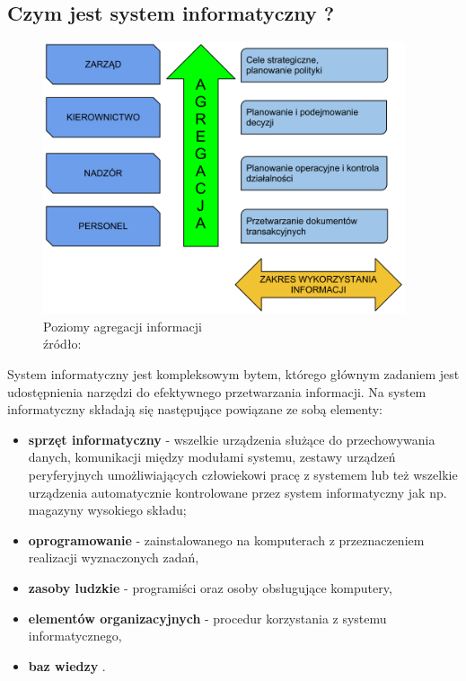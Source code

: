 	\subsection{Czym jest system informatyczny ?}
		\begin{figure}[H]
			\centering
			\includegraphics[width=0.95\textwidth]{images/poziomy_agregacji_informacji}
			\caption[Poziomy agregacji informacji w systemie informatycznym]{
				Poziomy agregacji informacji\\ 
				źródło: \cite{IDL}
			}
			\label{c3:information_level_figure}
		\end{figure}
		System informatyczny jest kompleksowym bytem, którego głównym zadaniem 
		jest udos\-tępnienia narzędzi do efektywnego przetwarzania informacji. 
		Na system informatyczny składają się następujące powiązane ze sobą elementy:
		\begin{itemize}
			\item \textbf{sprzęt informatyczny} - wszelkie urządzenia służące
			do przechowywania danych, komunikacji między modułami systemu, zestawy urządzeń
			peryferyjnych umożliwiających człowiekowi pracę z systemem lub też wszelkie urządzenia
			automatycznie kontrolowane przez system informatyczny jak np. magazyny wysokiego składu;
			\item \textbf{oprogramowanie} - zainstalowanego na komputerach z przeznaczeniem realizacji
			wyznaczonych zadań,
			\item \textbf{zasoby ludzkie} - programiści oraz osoby obsługujące komputery,
			\item \textbf{elementów organizacyjnych} - procedur korzystania z systemu informatycznego,
			\item \textbf{baz wiedzy} \cite{logistyka_w_przedsiebiorstwie}.
		\end{itemize}
		
